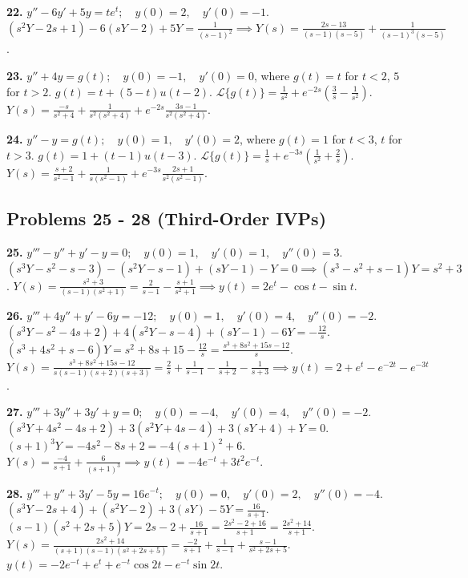 \documentclass[11pt, letterpaper]{article}
\theoremstyle{definition}
\theoremstyle{remark}
\newcommand{\Lap}{\mathcal{L}}
\begin{document}
\textbf{22.} $y'' - 6y' + 5y = te^t ; \quad y(0) = 2 , \quad y'(0) = -1$.
$(s^2 Y - 2s + 1) - 6(sY - 2) + 5Y = \frac{1}{(s - 1)^2} \implies Y(s) = \frac{2s - 13}{(s - 1)(s - 5)} + \frac{1}{(s - 1)^3(s - 5)}$.

\textbf{23.} $y'' + 4y = g(t) ; \quad y(0) = -1 , \quad y'(0) = 0$, where $g(t) = t$ for $t < 2$, $5$ for $t > 2$.
$g(t) = t + (5 - t)u(t - 2)$. $\Lap\{g(t)\} = \frac{1}{s^2} + e^{-2s}\left(\frac{3}{s} - \frac{1}{s^2}\right)$.
$Y(s) = \frac{-s}{s^2 + 4} + \frac{1}{s^2(s^2 + 4)} + e^{-2s}\frac{3s - 1}{s^2(s^2 + 4)}$.

\textbf{24.} $y'' - y = g(t) ; \quad y(0) = 1 , \quad y'(0) = 2$, where $g(t) = 1$ for $t < 3$, $t$ for $t > 3$.
$g(t) = 1 + (t - 1)u(t - 3)$. $\Lap\{g(t)\} = \frac{1}{s} + e^{-3s}\left(\frac{1}{s^2} + \frac{2}{s}\right)$.
$Y(s) = \frac{s + 2}{s^2 - 1} + \frac{1}{s(s^2 - 1)} + e^{-3s}\frac{2s + 1}{s^2(s^2 - 1)}$.

\subsection*{Problems 25 - 28 (Third-Order IVPs)}
\textbf{25.} $y''' - y'' + y' - y = 0 ; \quad y(0) = 1 , \quad y'(0) = 1 , \quad y''(0) = 3$.
$(s^3 Y - s^2 - s - 3) - (s^2 Y - s - 1) + (sY - 1) - Y = 0 \implies (s^3 - s^2 + s - 1)Y = s^2 + 3$.
$Y(s) = \frac{s^2 + 3}{(s - 1)(s^2 + 1)} = \frac{2}{s - 1} - \frac{s + 1}{s^2 + 1} \implies y(t) = 2e^t - \cos t - \sin t$.

\textbf{26.} $y''' + 4y'' + y' - 6y = -12 ; \quad y(0) = 1 , \quad y'(0) = 4 , \quad y''(0) = -2$.
$(s^3 Y - s^2 - 4s + 2) + 4(s^2 Y - s - 4) + (sY - 1) - 6Y = -\frac{12}{s}$.
$(s^3 + 4s^2 + s - 6)Y = s^2 + 8s + 15 - \frac{12}{s} = \frac{s^3 + 8s^2 + 15s - 12}{s}$.
$Y(s) = \frac{s^3 + 8s^2 + 15s - 12}{s(s - 1)(s + 2)(s + 3)} = \frac{2}{s} + \frac{1}{s - 1} - \frac{1}{s + 2} - \frac{1}{s + 3} \implies y(t) = 2 + e^t - e^{-2t} - e^{-3t}$.

\textbf{27.} $y''' + 3y'' + 3y' + y = 0 ; \quad y(0) = -4 , \quad y'(0) = 4 , \quad y''(0) = -2$.
$(s^3 Y + 4s^2 - 4s + 2) + 3(s^2 Y + 4s - 4) + 3(sY + 4) + Y = 0$.
$(s + 1)^3 Y = -4s^2 - 8s + 2 = -4(s + 1)^2 + 6$.
$Y(s) = \frac{-4}{s + 1} + \frac{6}{(s + 1)^3} \implies y(t) = -4e^{-t} + 3t^2 e^{-t}$.

\textbf{28.} $y''' + y'' + 3y' - 5y = 16e^{-t} ; \quad y(0) = 0 , \quad y'(0) = 2 , \quad y''(0) = -4$.
$(s^3 Y - 2s + 4) + (s^2 Y - 2) + 3(sY) - 5Y = \frac{16}{s + 1}$.
$(s - 1)(s^2 + 2s + 5)Y = 2s - 2 + \frac{16}{s + 1} = \frac{2s^2 - 2 + 16}{s + 1} = \frac{2s^2 + 14}{s + 1}$.
$Y(s) = \frac{2s^2 + 14}{(s + 1)(s - 1)(s^2 + 2s + 5)} = \frac{-2}{s + 1} + \frac{1}{s - 1} + \frac{s - 1}{s^2 + 2s + 5}$.
$y(t) = -2e^{-t} + e^t + e^{-t}\cos 2t - e^{-t}\sin 2t$.
\end{document}
